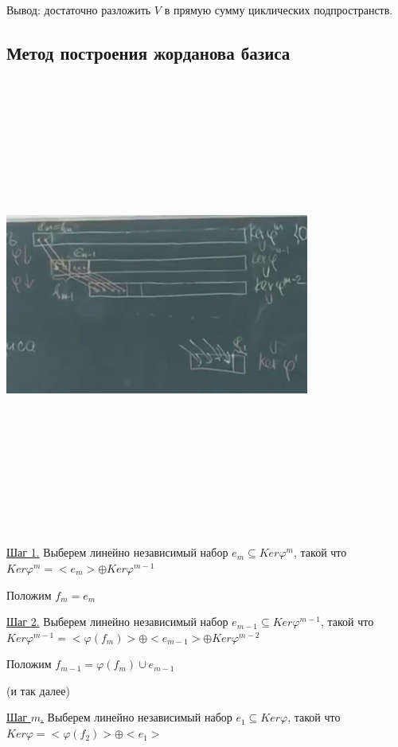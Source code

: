 Вывод: достаточно разложить $V$ в прямую сумму циклических подпространств.

\subsection{Метод построения жорданова базиса}

\bigskip
\includegraphics[width=10cm,height=15cm,keepaspectratio]{example7.jpg}

\bigskip
\underline{Шаг 1.} Выберем линейно независимый набор $e_m \subseteq Ker \varphi^m$, такой что $Ker \varphi^m = <e_m> \oplus Ker \varphi^{m-1}$

Положим $f_m = e_m$

\bigskip
\underline{Шаг 2.} Выберем линейно независимый набор $e_{m - 1} \subseteq Ker \varphi^{m-1}$, такой что $Ker \varphi^{m-1} = <\varphi(f_m)> \oplus <e_{m-1}> \oplus Ker \varphi^{m-2}$

Положим $f_{m-1} = \varphi(f_m) \cup e_{m-1}$

\bigskip
(и так далее)

\bigskip
\underline{Шаг $m$.} Выберем линейно независимый набор $e_1 \subseteq Ker \varphi$, такой что $Ker \varphi = <\varphi(f_2)> \oplus <e_1>$

